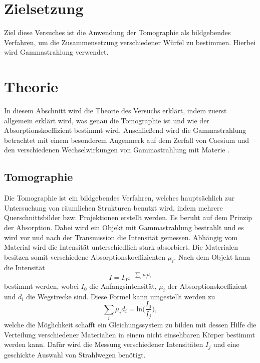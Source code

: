\section{Zielsetzung}
\label{sec:Zielsetzung}
Ziel diese Versuches ist die Anwendung der Tomographie als bildgebendes Verfahren, um die Zusammensetzung verschiedener Würfel zu bestimmen.
Hierbei wird Gammastrahlung verwendet.

\section{Theorie}
\label{sec:Theorie}
In diesem Abschnitt wird die Theorie des Versuchs erklärt, indem zuerst allgemein erklärt wird, was genau die Tomographie ist und wie der Absorptionskoeffizient bestimmt wird.
Anschließend wird die Gammastrahlung betrachtet mit einem besonderem Augenmerk auf dem Zerfall von Caesium und den verschiedenen Wechselwirkungen von Gammastrahlung mit Materie . 

\subsection{Tomographie}
\label{subsec:Tomographie}
Die Tomographie ist ein bildgebendes Verfahren, welches hauptsächlich zur Untersuchung von räumlichen Strukturen benutzt wird, indem mehrere Querschnittsbilder bzw. Projektionen erstellt werden.
Es beruht auf dem Prinzip der Absorption. Dabei wird ein Objekt mit Gammastrahlung bestrahlt und es wird vor und nach der Transmission die Intensität gemessen. Abhängig vom 
Material wird die Intensität unterschiedlich stark absorbiert. Die Materialen besitzen somit verschiedene Absorptionskoeffizienten $\mu_i$.
Nach dem Objekt kann die Intensität
\begin{equation*}
    I = I_0 \text{e}^{-\sum_i \mu_i d_i}
\end{equation*}
bestimmt werden, wobei $I_0$ die Anfangsintensität, $\mu_i$ der Absorptionskoeffizient und $d_i$ die Wegstrecke sind.
Diese Formel kann umgestellt werden zu
\begin{equation}
    \sum_i \mu_i d_i = \text{ln}\biggl(\frac{I_0}{I_j}\biggr),
    \label{eqn:mu}
\end{equation}
welche die Möglichkeit schafft ein Gleichungssystem zu bilden mit dessen Hilfe die Verteilung verschiedener Materialien in einem nicht einsehbaren Körper bestimmt werden kann.
Dafür wird die Messung verschiedener Intensitäten $I_j$ und eine geschickte Auswahl von Strahlwegen benötigt.

